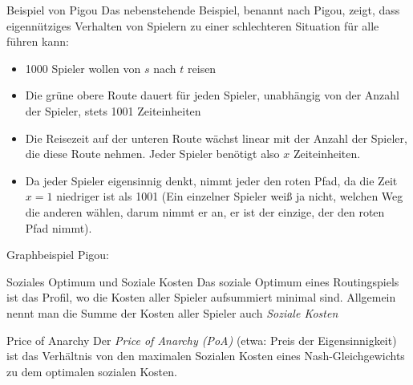 \documentclass{panikzettel}
\newcommand{\boxspace}{	\vspace{-\baselineskip}	}
\begin{document}
\begin{halfboxl}
	\boxspace
\begin{theo}{Beispiel von Pigou}
	Das nebenstehende Beispiel, benannt nach Pigou, zeigt, dass eigennütziges Verhalten von Spielern zu einer schlechteren Situation für alle führen kann:
	
	\begin{itemize}
		\item 1000 Spieler wollen von $s$ nach $t$ reisen
		\item Die grüne obere Route dauert für jeden Spieler, unabhängig von der Anzahl der Spieler, stets 1001 Zeiteinheiten
		\item Die Reisezeit auf der unteren Route wächst linear mit der Anzahl der Spieler, die diese Route nehmen. Jeder Spieler benötigt also $x$ Zeiteinheiten.
		\item Da jeder Spieler eigensinnig denkt, nimmt jeder den roten Pfad, da die Zeit $x = 1$ niedriger ist als 1001 (Ein einzelner Spieler weiß ja nicht, welchen Weg die anderen wählen, darum nimmt er an, er ist der einzige, der den roten Pfad nimmt).
	\end{itemize}
\end{theo}
\end{halfboxl}%
\begin{halfboxr}
	\boxspace
	Graphbeispiel Pigou:
	
	
	\begin{defi}{Soziales Optimum und Soziale Kosten}
		Das soziale Optimum eines Routingspiels ist das Profil, wo die Kosten aller Spieler aufsummiert minimal sind. Allgemein nennt man die Summe der Kosten aller Spieler auch \emph{Soziale Kosten}
	\end{defi}

	\begin{defi}{Price of Anarchy}
		Der \emph{Price of Anarchy (PoA)}  (etwa: Preis der Eigensinnigkeit) ist das Verhältnis von den maximalen Sozialen Kosten eines Nash-Gleichgewichts zu dem optimalen sozialen Kosten.
	\end{defi}
\end{halfboxr}
\end{document}
